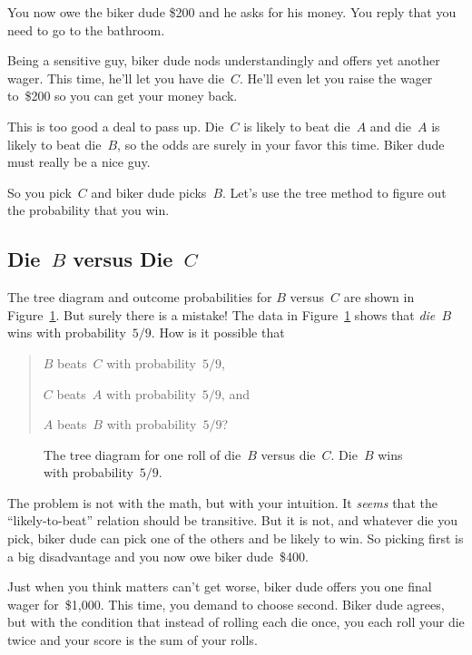You now owe the biker dude \$200 and he asks for his money.  You reply
that you need to go to the bathroom.

Being a sensitive guy, biker dude nods understandingly and offers yet
another wager.  This time, he'll let you have die~$C$.  He'll even let
you raise the wager to~\$200 so you can get your money back.

This is too good a deal to pass up.  Die~$C$ is likely to beat die~$A$
and die~$A$ is likely to beat die~$B$, so the odds are surely in your
favor this time.  Biker dude must really be a nice guy.

So you pick~$C$ and biker dude picks~$B$.  Let's use the tree method
to figure out the probability that you win.

\subsection{Die~$B$ versus Die~$C$}

The tree diagram and outcome probabilities for $B$ versus~$C$ are
shown in Figure~\ref{fig:14A10}.  But surely there is a mistake!  The
data in Figure~\ref{fig:14A10} shows that \emph{die~$B$} wins with
probability~$5/9$.  How is it possible that
\begin{quote}

$B$ beats~$C$ with probability~$5/9$,

$C$ beats~$A$ with probability~$5/9$, and

$A$ beats~$B$ with probability~$5/9$?

\end{quote}

\begin{figure}


\caption{The tree diagram for one roll of die~$B$ versus die~$C$.
  Die~$B$ wins with probability~$5/9$.}

\label{fig:14A10}

\end{figure}

The problem is not with the math, but with your intuition.  It
\emph{seems} that the ``likely-to-beat'' relation should be
transitive.  But it is not, and whatever die you pick, biker dude can
pick one of the others and be likely to win.  So picking first is a
big disadvantage and you now owe biker dude~\$400.

Just when you think matters can't get worse, biker dude offers you one
final wager for~\$1,000.  This time, you demand to choose second.
Biker dude agrees, but with the condition that instead of rolling each
die once, you each roll your die twice and your score is the sum of
your rolls.

